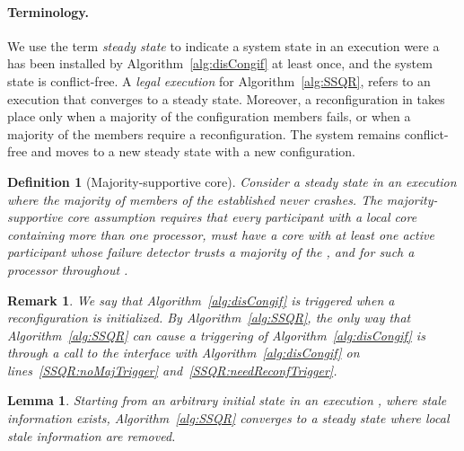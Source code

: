 \documentclass[11pt]{article}
\newtheorem{lemma}[theorem]{Lemma}
\newtheorem{remark}{Remark}
\newtheorem{definition}{Definition}[section]
\begin{document}
\paragraph{Terminology.} We use the term \emph{steady  state} to indicate a system state in an execution were a  has been installed by Algorithm~\ref{alg:disCongif} at least once, and the system state is conflict-free.
A \emph{legal execution}  for Algorithm~\ref{alg:SSQR}, refers to an execution that converges to a steady  state.
Moreover, a reconfiguration in  takes place only when a majority of the configuration members fails, or when a majority of the members require a reconfiguration.
The system remains conflict-free and moves to a new steady  state with a new configuration.

\begin{definition} [Majority-supportive core]
\label{def:majSupCore}
Consider a steady  state in an execution  where the majority of members of the established  never crashes.
The \emph{majority-supportive core} assumption requires that every participant  with a local core   containing more than one processor, must have a core with at least one active participant  whose failure detector trusts a majority of the , and for such a processor  throughout . 
\end{definition}

\begin{remark}
\label{rem:reconfThroughInterface}
We say that Algorithm~\ref{alg:disCongif} is \emph{triggered} when a reconfiguration is initialized. By Algorithm~\ref{alg:SSQR}, the only way that Algorithm~\ref{alg:SSQR} can cause a triggering of Algorithm~\ref{alg:disCongif} is through a call to the  interface with Algorithm~\ref{alg:disCongif} on lines~\ref{SSQR:noMajTrigger} and~\ref{SSQR:needReconfTrigger}.
\end{remark}


\begin{lemma}
\label{thQ:reachSteady}
Starting from an arbitrary initial state in an execution , where stale information exists, Algorithm~\ref{alg:SSQR} converges to a steady  state where local stale information are removed.
\end{lemma}
\end{document}
